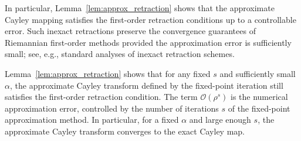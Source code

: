 \documentclass[11pt,a4paper]{article}
\numberwithin{equation}{section}
\newcommand{\cO}{{\mathcal O}}
\theoremstyle{plain}
\theoremstyle{definition}
\theoremstyle{remark}
\begin{document}
In particular, Lemma~\ref{lem:approx_retraction} shows that the approximate Cayley mapping satisfies the first-order retraction conditions up to a controllable error. Such inexact retractions preserve the convergence guarantees of Riemannian first-order methods provided the approximation error is sufficiently small; see, e.g., standard analyses of inexact retraction schemes.

Lemma~\ref{lem:approx_retraction} shows that for any fixed $s$ and sufficiently small $\alpha$, the approximate Cayley transform defined by the fixed-point iteration still satisfies the first-order retraction condition. The term $ \cO(\rho^{s}) $ is the numerical approximation error, controlled by the number of iterations $s$ of the fixed-point approximation method. In particular, for a fixed $ \alpha $ and large enough $ s $, the approximate Cayley transform converges to the exact Cayley map.
\end{document}
